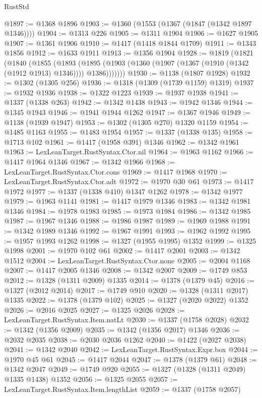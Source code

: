 \begin{lexlean}{RustStd}
\begin{coremodule}
@1897 := @1368 @1896
@1903 := @1360 (@1553 (@1367 (@1847 (@1342 @1897 @1346))))
@1904 := @1313 @226
@1905 := @1311 @1904
@1906 := @1627 @1905
@1907 := @1361 @1906
@1910 := @1417 (@1418 @1844 @1709)
@1911 := @1343 @1856
@1912 := @1633 @1911
@1913 := @1356 @1904
@1928 := @1819
    (@1821
      (@1840
        (@1855
          (@1893
            (@1895 (@1903 (@1360 (@1907 (@1367 (@1910 (@1342 (@1912 @1913) @1346)))) @1386)))))))
@1930 := @1138 (@1807 @1928)
@1932 := @1302 (@1305 @256)
@1936 := @1318 (@1309 (@1739 @1159) @1319)
@1937 := @1932 @1936
@1938 := @1322 @1223
@1939 := @1937 @1938
@1941 := @1337 (@1338 @263)
@1942 := @1342 @1438
@1943 := @1942 @1346
@1944 := @1345 @1943
@1946 := @1941 @1944 @1262
@1947 := @1367 @1946
@1949 := @1138 (@1939 @1947)
@1953 := @1302 (@1305 @270) @1320 @1159
@1954 := @1485 @1163
@1955 := @1483 @1954
@1957 := @1337 (@1338 @135)
@1958 := @1713 @102
@1961 := @1417 (@1958 @391) @1346
@1962 := @1342 @1961
@1963 := LexLeanTarget.RustSyntax.Ctor.nil
@1964 := @1963 @1162
@1966 := @1417 @1964 @1346
@1967 := @1342 @1966
@1968 := LexLeanTarget.RustSyntax.Ctor.cons
@1969 := @1417 @1968
@1970 := LexLeanTarget.RustSyntax.Ctor.adt
@1972 := @1970 @30 @61
@1973 := @1417 @1972
@1977 := @1337 (@1338 @410) @1347 @1262
@1978 := @1342 @1977
@1979 := @1963 @1141
@1981 := @1417 @1979 @1346
@1983 := @1342 @1981 @1346
@1984 := @1978 @1983
@1985 := @1973 @1984
@1986 := @1342 @1985
@1987 := @1967 @1346
@1988 := @1986 @1987
@1989 := @1969 @1988
@1991 := @1342 @1989 @1346
@1992 := @1967 @1991
@1993 := @1962 @1992
@1995 := @1957 @1993 @1262
@1998 := @1327 (@1955 @1995) @1352
@1999 := @1325 @1998
@2001 := @1970 @102 @61
@2002 := @1417 @2001
@2003 := @1342 @1512
@2004 := LexLeanTarget.RustSyntax.Ctor.none
@2005 := @2004 @1168
@2007 := @1417 @2005 @1346
@2008 := @1342 @2007
@2009 := @1749 @853
@2012 := @1328 (@1311 @2009) @1335
@2014 := @1378 (@1379 @45)
@2016 := @1327 (@2012 @2014)
@2017 := @1749 @910
@2020 := @1328 (@1311 @2017) @1335
@2022 := @1378 (@1379 @102)
@2025 := @1327 (@2020 @2022) @1352
@2026 := @2016 @2025
@2027 := @1325 @2026
@2028 := LexLeanTarget.RustSyntax.Item.natLt
@2030 := @1337 (@1758 @2028)
@2032 := @1342 (@1356 @2009)
@2035 := @1342 (@1356 @2017) @1346
@2036 := @2032 @2035
@2038 := @2030 @2036 @1262
@2040 := @1422 (@2027 @2038)
@2041 := @1342 @2040
@2042 := LexLeanTarget.RustSyntax.Expr.box
@2044 := @1970 @45 @61
@2045 := @1417 @2044
@2047 := @1378 (@1379 @61)
@2048 := @1342 @2047
@2049 := @1749 @920
@2055 := @1327 (@1328 (@1311 @2049) @1335 @1438) @1352
@2056 := @1325 @2055
@2057 := LexLeanTarget.RustSyntax.Item.lengthList
@2059 := @1337 (@1758 @2057)

\end{coremodule}
\end{lexlean}
